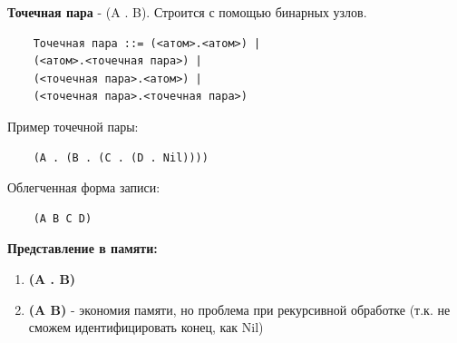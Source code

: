 \textbf{Точечная пара} - (A . B). Строится с помощью бинарных узлов.   

\begin{lstlisting}
	Точечная пара ::= (<атом>.<атом>) |
	(<атом>.<точечная пара>) |
	(<точечная пара>.<атом>) |
	(<точечная пара>.<точечная пара>)	
\end{lstlisting}

Пример точечной пары:
\begin{lstlisting}
	(A . (B . (C . (D . Nil))))
\end{lstlisting}
Облегченная форма записи:
\begin{lstlisting}
	(A B C D)
\end{lstlisting}

\begin{figure}[ht!]
\end{figure}

\textbf{Представление в памяти:}

\begin{enumerate}
	\item \textbf{(A . B)}
	\begin{figure}[ht!]
	\end{figure}
	\item \textbf{(A B)} - экономия памяти, но проблема при рекурсивной обработке (т.к. не сможем идентифицировать конец, как Nil)
	\begin{figure}[ht!]
	\end{figure}
\end{enumerate}

